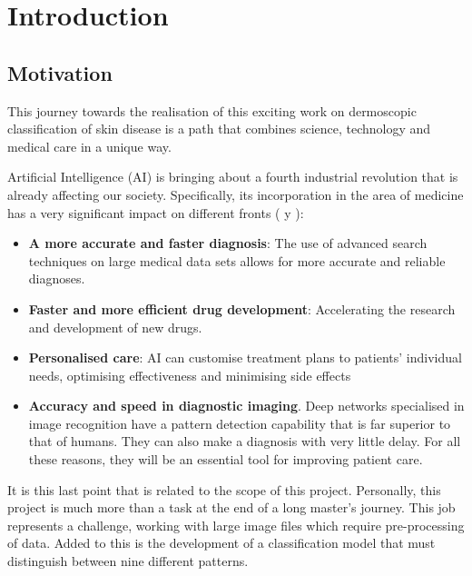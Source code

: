 \chapter{Introduction}
\label{chapter:introduction}


\section{Motivation}

This journey towards the realisation of this exciting work on dermoscopic classification of skin disease is a path that combines science, technology and medical care in a unique way. 

Artificial Intelligence (AI) is bringing about a fourth industrial revolution that is already affecting our society. Specifically, its incorporation in the area of medicine has a very significant impact on different fronts (\cite{luciaclemares_que_2023} y \cite{apd_aplicaciones_IA_Medicina}):

\begin{itemize}
    \item \textbf{A more accurate and faster diagnosis}: The use of advanced search techniques on large medical data sets allows for more accurate and reliable diagnoses. 
    \item \textbf{Faster and more efficient drug development}: Accelerating the research and development of new drugs.
    \item \textbf{Personalised care}: AI can customise treatment plans to patients' individual needs, optimising effectiveness and minimising side effects
    \item \textbf{Accuracy and speed in diagnostic imaging}. Deep networks specialised in image recognition have a pattern detection capability that is far superior to that of humans. They can also make a diagnosis with very little delay. For all these reasons, they will be an essential tool for improving patient care. 
\end{itemize}

It is this last point that is related to the scope of this project. Personally, this project is much more than a task at the end of a long master's journey. This job represents a challenge, working with large image files which require pre-processing of data. Added to this is the development of a classification model that must distinguish between nine different patterns.

